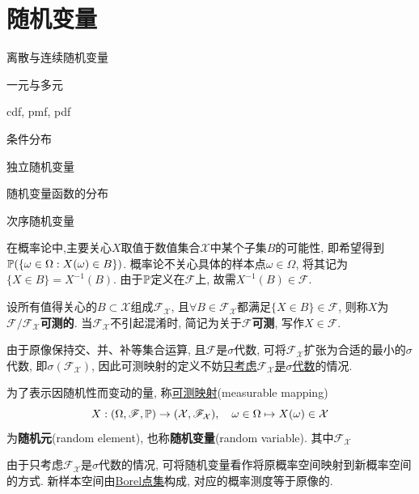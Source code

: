 \chapter{随机变量}

\begin{introduction}
    \item 离散与连续随机变量
    \item 一元与多元
    \item cdf, pmf, pdf
    \item 条件分布
    \item 独立随机变量
    \item 随机变量函数的分布
    \item 次序随机变量
\end{introduction}

在概率论中,主要关心$X$取值于数值集合$\mathcal{X}$中某个子集$B$的可能性, 即希望得到$\P(\{\omega\in\Omega : X(\omega) \in B\})$. 概率论不关心具体的样本点$\omega\in\Omega$, 将其记为$\{X \in B\} = X^{-1}(B)$. 由于$\P$定义在$\mathscr{F}$上, 故需$X^{-1}(B) \in \mathscr{F}$.

\begin{definition}[可测性]
    设所有值得关心的$B\subset \mathcal{X}$组成$\mathscr{F}_{\mathcal{X}}$, 且$\forall B \in \mathscr{F}_{\mathcal{X}}$都满足$\{X\in B\} \in \mathscr{F}$, 则称$X$为$\mathscr{F}/\mathscr{F}_{\mathcal{X}}$\textbf{可测的}. 当$\mathscr{F}_{\mathcal{X}}$不引起混淆时, 简记为关于$\mathscr{F}$\textbf{可测}, 写作$X \in \mathscr{F}$.
\end{definition}

由于原像保持交、并、补等集合运算, 且$\mathscr{F}$是$\sigma$代数, 可将$\mathscr{F}_{\mathcal{X}}$扩张为合适的最小的$\sigma$代数, 即$\sigma(\mathscr{F}_{\mathcal{X}})$, 因此可测映射的定义不妨\underline{只考虑$\mathscr{F}_{\mathcal{X}}$是$\sigma$代数}的情况.

\begin{definition}[随机变量]
    为了表示因随机性而变动的量, 称\underline{可测映射}(measurable mapping)
    \[ X : (\Omega,\mathscr{F},\P) \to (\mathcal{X},\mathscr{F}_{\mathcal{X}}), \quad \omega\in\Omega \mapsto X(\omega)\in\mathcal{X} \]
    为\textbf{随机元}(random element), 也称\textbf{随机变量}(random variable). 其中$\mathscr{F}_{\mathcal{X}}$
\end{definition}

由于只考虑$\mathscr{F}_{\mathcal{X}}$是$\sigma$代数的情况, 可将随机变量看作将原概率空间映射到新概率空间的方式. 新样本空间由\underline{Borel点集}构成, 对应的概率测度等于原像的.

